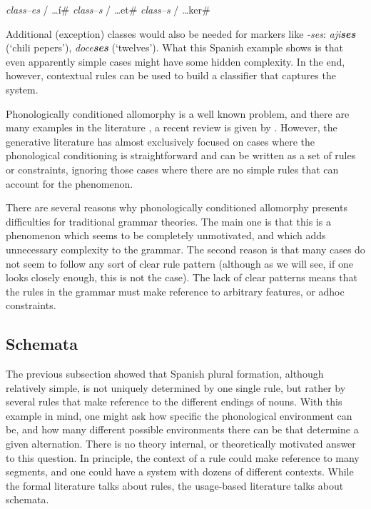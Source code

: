 \begin{exe}
    \ex \begin{xlist}
        \ex \textit{class--es} / \dots{}í\#
        \ex \textit{class--s} / \dots{}et\#
        \ex \textit{class--s} / \dots{}ker\#
    \end{xlist}
\end{exe}

Additional (exception) classes would also be needed for markers like \textit{-ses}: \textit{aji\textbf{ses}} (`chili pepers'), \textit{doce\textbf{ses}} (`twelves'). What this Spanish example shows is that even apparently simple cases might have some hidden complexity. In the end, however, contextual rules can be used to build a classifier that captures the system.

Phonologically conditioned allomorphy is a well known problem, and there are many examples in the literature \autocites{Alber.2009, Anderson.2008, Baptista.2006, Booij.1998, Carstairs.1998, Malkiel.1988, Rubach.2001}, a recent review is given by \textcite{Nevins.2011a}. However, the generative literature has almost exclusively focused on cases where the phonological conditioning is straightforward and can be written as a set of rules or constraints, ignoring those cases where there are no simple rules that can account for the phenomenon.

There are several reasons why phonologically conditioned allomorphy presents difficulties for traditional grammar theories. The main one is that this is a phenomenon which seems to be completely unmotivated, and which adds unnecessary complexity to the grammar. The second reason is that many cases do not seem to follow any sort of clear rule pattern (although as we will see, if one looks closely enough, this is not the case). The lack of clear patterns means that the rules in the grammar must make reference to arbitrary features, or adhoc constraints.



\subsection{Schemata}


The previous subsection showed that Spanish plural formation, although relatively simple, is not uniquely determined by one single rule, but rather by several rules that make reference to the different endings of nouns. With this example in mind, one might ask how specific the phonological environment can be, and how many different possible environments there can be that determine a given alternation. There is no theory internal, or theoretically motivated answer to this question. In principle, the context of a rule could make reference to many segments, and one could have a system with dozens of different contexts. While the formal literature talks about rules, the usage-based literature talks about schemata.

